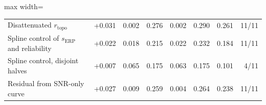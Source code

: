 \begin{table}[H]
\begin{adjustbox}{max width=\textwidth}
\begin{tabular}{@{}lrrrrrrr@{}}
Disattenuated $r_\mathrm{topo}$ & +0.031 & 0.002 & 0.276 & 0.002 & 0.290 & 0.261 & 11/11 \\
Spline control of $s_\mathrm{ERP}$ and reliability & +0.022 & 0.018 & 0.215 & 0.022 & 0.232 & 0.184 & 11/11 \\
Spline control, disjoint halves & +0.007 & 0.065 & 0.175 & 0.063 & 0.175 & 0.101 & 4/11 \\
Residual from SNR-only curve & +0.027 & 0.009 & 0.259 & 0.004 & 0.264 & 0.238 & 11/11 \\
\bottomrule
\end{tabular}
\end{adjustbox}
\end{table}

